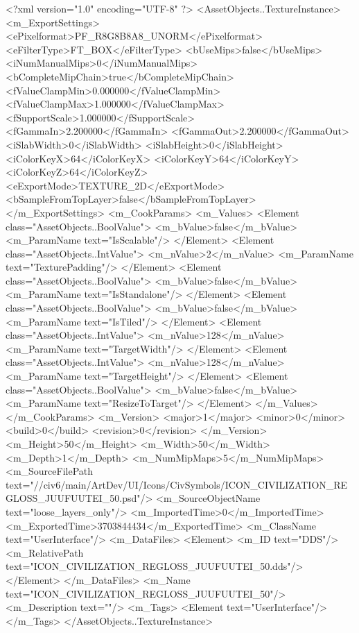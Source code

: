 <?xml version="1.0" encoding="UTF-8" ?>
<AssetObjects..TextureInstance>
	<m_ExportSettings>
		<ePixelformat>PF_R8G8B8A8_UNORM</ePixelformat>
		<eFilterType>FT_BOX</eFilterType>
		<bUseMips>false</bUseMips>
		<iNumManualMips>0</iNumManualMips>
		<bCompleteMipChain>true</bCompleteMipChain>
		<fValueClampMin>0.000000</fValueClampMin>
		<fValueClampMax>1.000000</fValueClampMax>
		<fSupportScale>1.000000</fSupportScale>
		<fGammaIn>2.200000</fGammaIn>
		<fGammaOut>2.200000</fGammaOut>
		<iSlabWidth>0</iSlabWidth>
		<iSlabHeight>0</iSlabHeight>
		<iColorKeyX>64</iColorKeyX>
		<iColorKeyY>64</iColorKeyY>
		<iColorKeyZ>64</iColorKeyZ>
		<eExportMode>TEXTURE_2D</eExportMode>
		<bSampleFromTopLayer>false</bSampleFromTopLayer>
	</m_ExportSettings>
	<m_CookParams>
		<m_Values>
			<Element class="AssetObjects..BoolValue">
				<m_bValue>false</m_bValue>
				<m_ParamName text="IsScalable"/>
			</Element>
			<Element class="AssetObjects..IntValue">
				<m_nValue>2</m_nValue>
				<m_ParamName text="TexturePadding"/>
			</Element>
			<Element class="AssetObjects..BoolValue">
				<m_bValue>false</m_bValue>
				<m_ParamName text="IsStandalone"/>
			</Element>
			<Element class="AssetObjects..BoolValue">
				<m_bValue>false</m_bValue>
				<m_ParamName text="IsTiled"/>
			</Element>
			<Element class="AssetObjects..IntValue">
				<m_nValue>128</m_nValue>
				<m_ParamName text="TargetWidth"/>
			</Element>
			<Element class="AssetObjects..IntValue">
				<m_nValue>128</m_nValue>
				<m_ParamName text="TargetHeight"/>
			</Element>
			<Element class="AssetObjects..BoolValue">
				<m_bValue>false</m_bValue>
				<m_ParamName text="ResizeToTarget"/>
			</Element>
		</m_Values>
	</m_CookParams>
	<m_Version>
		<major>1</major>
		<minor>0</minor>
		<build>0</build>
		<revision>0</revision>
	</m_Version>
	<m_Height>50</m_Height>
	<m_Width>50</m_Width>
	<m_Depth>1</m_Depth>
	<m_NumMipMaps>5</m_NumMipMaps>
	<m_SourceFilePath text="//civ6/main/ArtDev/UI/Icons/CivSymbols/ICON_CIVILIZATION_REGLOSS_JUUFUUTEI_50.psd"/>
	<m_SourceObjectName text="loose_layers_only"/>
	<m_ImportedTime>0</m_ImportedTime>
	<m_ExportedTime>3703844434</m_ExportedTime>
	<m_ClassName text="UserInterface"/>
	<m_DataFiles>
		<Element>
			<m_ID text="DDS"/>
			<m_RelativePath text="ICON_CIVILIZATION_REGLOSS_JUUFUUTEI_50.dds"/>
		</Element>
	</m_DataFiles>
	<m_Name text="ICON_CIVILIZATION_REGLOSS_JUUFUUTEI_50"/>
	<m_Description text=""/>
	<m_Tags>
		<Element text="UserInterface"/>
	</m_Tags>
</AssetObjects..TextureInstance>

